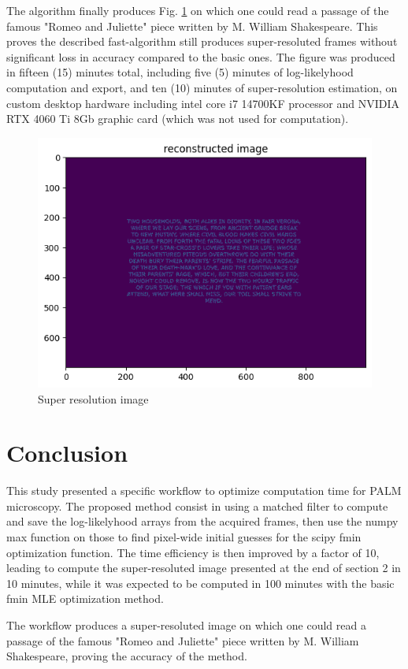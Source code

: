 \documentclass[10pt,letterpaper]{article}
\begin{document}
The algorithm finally produces Fig. \ref{fig:super} on which one could read a passage of the famous "Romeo and Juliette" piece written by M. William Shakespeare. This proves the described fast-algorithm still produces super-resoluted frames without significant loss in accuracy compared to the basic ones. The figure was produced in fifteen (15) minutes total, including five (5) minutes of log-likelyhood computation and export, and ten (10) minutes of super-resolution estimation, on custom desktop hardware including intel core i7 14700KF processor and NVIDIA RTX 4060 Ti 8Gb graphic card (which was not used for computation).

\begin{figure}[h]
	\centering
	\includegraphics[scale=0.65]{solved text.png}
	\caption{Super resolution image}
	\label{fig:super}
\end{figure}

\section{Conclusion}
This study presented a specific workflow to optimize computation time for PALM microscopy. The proposed method consist in using a matched filter to compute and save the log-likelyhood arrays from the acquired frames, then use the numpy max function on those to find pixel-wide initial guesses for the scipy fmin optimization function. The time efficiency is then improved by a factor of 10, leading to compute the super-resoluted image presented at the end of section 2 in 10 minutes, while it was expected to be computed in 100 minutes with the basic fmin MLE optimization method.

The workflow produces a super-resoluted image on which one could read a passage of the famous "Romeo and Juliette" piece written by M. William Shakespeare, proving the accuracy of the method.
\end{document}

